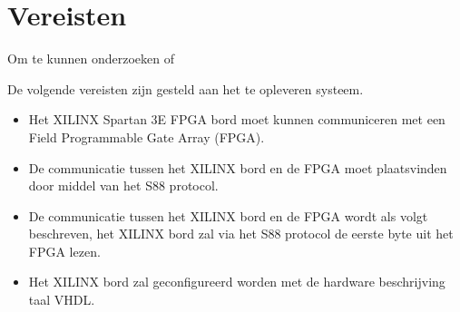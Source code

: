 \textit{}\chapter{Vereisten}

Om te kunnen onderzoeken of 

De volgende vereisten zijn gesteld aan het te opleveren systeem.

\begin{itemize}
	\item Het XILINX Spartan 3E FPGA bord moet kunnen communiceren met een Field Programmable Gate Array (FPGA).
	\item De communicatie tussen het XILINX bord en de FPGA moet plaatsvinden door middel van het S88 protocol.
	\item De communicatie tussen het XILINX bord en de FPGA wordt als volgt beschreven, het XILINX bord zal via het S88 protocol de eerste byte uit het FPGA lezen.
	\item Het XILINX bord zal geconfigureerd worden met de hardware beschrijving taal VHDL.
\end{itemize}